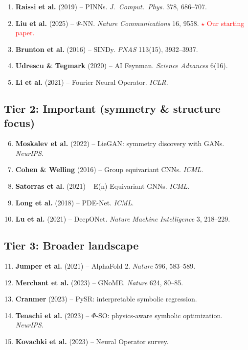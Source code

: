 \documentclass[11pt,a4paper]{article}
\begin{document}
\begin{enumerate}[leftmargin=1.8em,itemsep=3pt]
\item \textbf{Raissi et al.} (2019) -- PINNs. \textit{J.\ Comput.\ Phys.} 378, 686--707.
\item \textbf{Liu et al.} (2025) -- $\Psi$-NN. \textit{Nature Communications} 16, 9558. \textcolor{red}{$\star$ Our starting paper.}
\item \textbf{Brunton et al.} (2016) -- SINDy. \textit{PNAS} 113(15), 3932--3937.
\item \textbf{Udrescu \& Tegmark} (2020) -- AI Feynman. \textit{Science Advances} 6(16).
\item \textbf{Li et al.} (2021) -- Fourier Neural Operator. \textit{ICLR}.
\end{enumerate}

\subsection{Tier 2: Important (symmetry \& structure focus)}

\begin{enumerate}[leftmargin=1.8em,itemsep=3pt]
\setcounter{enumi}{5}
\item \textbf{Moskalev et al.} (2022) -- LieGAN: symmetry discovery with GANs. \textit{NeurIPS}.
\item \textbf{Cohen \& Welling} (2016) -- Group equivariant CNNs. \textit{ICML}.
\item \textbf{Satorras et al.} (2021) -- E(n) Equivariant GNNs. \textit{ICML}.
\item \textbf{Long et al.} (2018) -- PDE-Net. \textit{ICML}.
\item \textbf{Lu et al.} (2021) -- DeepONet. \textit{Nature Machine Intelligence} 3, 218--229.
\end{enumerate}

\subsection{Tier 3: Broader landscape}

\begin{enumerate}[leftmargin=1.8em,itemsep=3pt]
\setcounter{enumi}{10}
\item \textbf{Jumper et al.} (2021) -- AlphaFold 2. \textit{Nature} 596, 583--589.
\item \textbf{Merchant et al.} (2023) -- GNoME. \textit{Nature} 624, 80--85.
\item \textbf{Cranmer} (2023) -- PySR: interpretable symbolic regression.
\item \textbf{Tenachi et al.} (2023) -- $\Phi$-SO: physics-aware symbolic optimization. \textit{NeurIPS}.
\item \textbf{Kovachki et al.} (2023) -- Neural Operator survey.
\end{enumerate}
\end{document}
